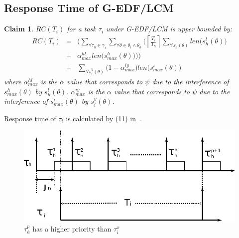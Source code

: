 \documentclass[letter]{sig-alternate}
\newtheorem{clm}{Claim}
\begin{document}
\subsection{\label{response g-edf/lcm} Response Time of G-EDF/LCM}


\begin{clm}\label{GEDF/LCM response time}
$RC(T_i)$ for a task $\tau_i$ under G-EDF/LCM is upper bounded by:
\begin{eqnarray}
RC(T_i) & = & \Bigg(\sum_{\forall \tau_h \in \gamma_i}\sum_{\forall\theta \in \theta_i \wedge \theta_h}\Bigg(\left\lceil\frac{T_{i}}{T_{h}}\right\rceil\sum_{\forall s_{h}^{l}(\theta)}len\Big(s_{h}^{l}(\theta)\Big)\nonumber\\
& + & \alpha_{max}^{hl}len\Big(s_{max}^{h}(\theta)\Big)\Bigg)\Bigg)\nonumber\\
& + & \sum_{\forall s_{i}^{y}(\theta)}\Big(1-\alpha_{max}^{iy}\Big)len\Big(s_{max}^i(\theta)\Big)  
\label{eq78}\end{eqnarray} 
where $\alpha_{max}^{hl}$ is the $\alpha$ value that corresponds to $\psi$ due to the interference of $s_{max}^h(\theta)$ by $s_h^l(\theta)$. $\alpha_{max}^{iy}$ is the $\alpha$ value that corresponds to $\psi$ due to the interference of $s_{max}^i(\theta)$ by $s_i^y(\theta)$.
\end{clm}


Response time of $\tau_{i}$ is calculated by (11) in~\cite{stmconcurrencycontrol:emsoft11}.
\begin{figure}
\begin{centering}
\includegraphics[scale=0.5]{figures/figure18}
\par\end{centering}
\caption{\label{fig17}$\tau_h^p$ has a higher priority than $\tau_i^x$}
\end{figure}
\end{document}
